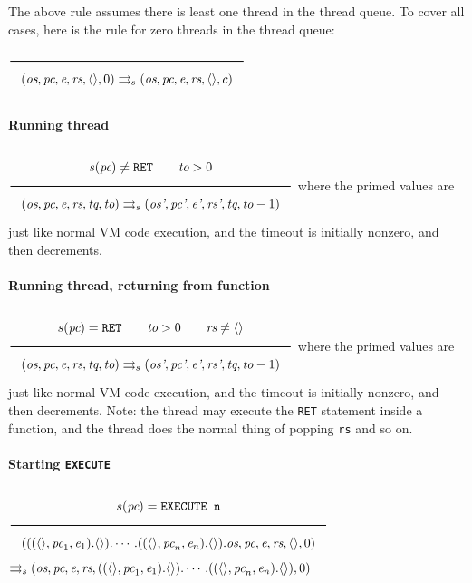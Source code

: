 The above rule assumes there is least one thread in the thread queue. To cover all cases, here is the rule for zero threads in the thread queue:
\(\\\Rule{}{(\textit{os}, \textit{pc}, \textit{e}, \textit{rs}, \langle \rangle, 0) \transition (\textit{os}, \textit{pc}, \textit{e}, \textit{rs}, \langle \rangle, c)}\\\)

\paragraph{Running thread}
\label{sec:orgfa4cc96}
\(\\\Rule{s(\textit{pc}) \neq \texttt{RET} \qquad \textit{to} > 0}{(\textit{os}, \textit{pc}, \textit{e}, \textit{rs}, \textit{tq}, \textit{to}) \transition (\textit{os'}, \textit{pc'}, \textit{e'}, \textit{rs'}, \textit{tq}, \textit{to}-1)}\\\)
where the primed values are just like normal VM code execution, and the timeout is initially nonzero, and then decrements.

\paragraph{Running thread, returning from function}
\label{sec:orgc0cd6b5}
\(\\\Rule{s(\textit{pc}) = \texttt{RET} \qquad \textit{to} > 0 \qquad \textit{rs} \neq \langle \rangle}{(\textit{os}, \textit{pc}, \textit{e}, \textit{rs}, \textit{tq}, \textit{to}) \transition (\textit{os'}, \textit{pc'}, \textit{e'}, \textit{rs'}, \textit{tq}, \textit{to}-1)}\\\)
where the primed values are just like normal VM code execution, and the timeout is initially nonzero, and then decrements. Note: the thread may execute the \texttt{RET} statement inside a function, and the thread does the normal thing of popping \texttt{rs} and so on.

\paragraph{Starting \texttt{EXECUTE}}
\label{sec:org4147d00}
\(\\\Rule{s(\textit{pc}) = \texttt{EXECUTE n}}{(((\langle \rangle, \textit{pc}_1, \textit{e}_1).\langle \rangle). \cdots .((\langle \rangle, \textit{pc}_n, \textit{e}_n).\langle \rangle).\textit{os}, \textit{pc}, \textit{e}, \textit{rs}, \langle \rangle, 0)}\\\)
\(\rightrightarrows_s (\textit{os}, \textit{pc}, \textit{e}, \textit{rs}, ((\langle \rangle, \textit{pc}_1, \textit{e}_1).\langle \rangle). \cdots .((\langle \rangle, \textit{pc}_n, \textit{e}_n).\langle \rangle), 0)\\\)

